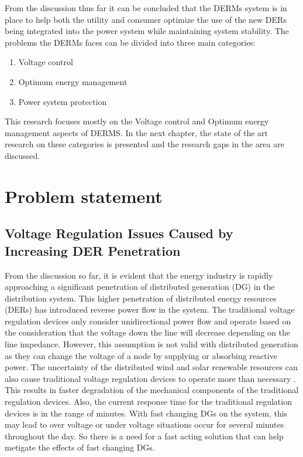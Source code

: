 From the discussion thus far it can be concluded that the DERMs system is in place to help both the utility and consumer optimize the use of the new DERs being integrated into the power system while maintaining system stability. The problems the DERMs faces can be divided into three main categories:
\begin{enumerate}
    \item Voltage control
    \item Optimum energy management
    \item Power system protection
\end{enumerate}

This research focuses mostly on the Voltage control and Optimum energy management aspects of DERMS. In the next chapter, the state of the art research on these categories is presented and the research gaps in the area are discussed.

\section{Problem statement}
\subsection{Voltage Regulation Issues Caused by Increasing DER Penetration}
From the discussion so far, it is evident that the energy industry is rapidly approaching a significant penetration of distributed generation (DG) in the distribution system. This higher penetration of distributed energy resources (DERs) has introduced reverse power flow in the system. The traditional voltage regulation devices only consider unidirectional power flow and operate based on the consideration that the voltage down the line will decrease depending on the line impedance. However, this assumption is not valid with distributed generation as they can change the voltage of a node by supplying or absorbing reactive power. The uncertainty of the distributed wind and solar renewable resources can also cause traditional voltage regulation devices to operate more than necessary \cite{int1}. This results in faster degradation of the mechanical components of the traditional regulation devices. Also, the current response time for the traditional regulation devices is in the range of minutes. With fast changing DGs on the system, this may lead to over voltage or under voltage situations occur for several minutes throughout the day. So there is a need for a fast acting solution that can help metigate the effects of fast changing DGs.

